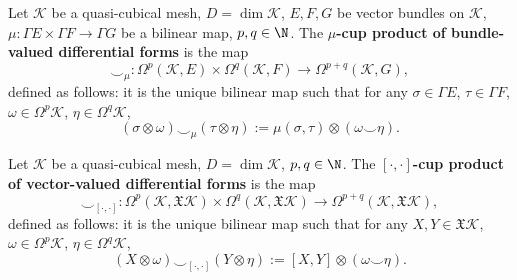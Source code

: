 \begin{definition}
  Let
    $\mathcal{K}$ be a quasi-cubical mesh,
    $D = \dim \mathcal{K}$,
    $E, F, G$ be vector bundles on $\mathcal{K}$,
    $\mu \colon \Gamma E \times \Gamma F \to \Gamma G$ be a bilinear map,
    $p, q \in \N$.
  The \textbf{$\mu$-cup product of bundle-valued differential forms} is the map
  \begin{equation}
    \smile_\mu
    \colon \Omega^p(\mathcal{K}, E) \times \Omega^q(\mathcal{K}, F)
    \to \Omega^{p + q}(\mathcal{K}, G),
  \end{equation}
  defined as follows: it is the unique bilinear map such that for any
  $\sigma \in \Gamma E$,
  $\tau \in \Gamma F$,
  $\omega \in \Omega^p \mathcal{K}$,
  $\eta \in \Omega^q \mathcal{K}$,
  \begin{equation}
    (\sigma \otimes \omega) \smile_\mu (\tau \otimes \eta) :=
    \mu(\sigma, \tau) \otimes (\omega \smile \eta).
  \end{equation}
\end{definition}
\begin{example}
  Let
    $\mathcal{K}$ be a quasi-cubical mesh,
    $D = \dim \mathcal{K}$,
    $p, q \in \N$.
  The \textbf{$[\cdot, \cdot]$-cup product of vector-valued differential forms}
  is the map
  \begin{equation}
    \smile_{[\cdot, \cdot]}
    \colon \Omega^p(\mathcal{K}, \mathfrak{X} \mathcal{K})
    \times \Omega^q(\mathcal{K}, \mathfrak{X} \mathcal{K})
    \to \Omega^{p + q}(\mathcal{K}, \mathfrak{X} \mathcal{K}),
  \end{equation}
  defined as follows: it is the unique bilinear map such that for any
  $X, Y \in \mathfrak{X} \mathcal{K}$,
  $\omega \in \Omega^p \mathcal{K}$,
  $\eta \in \Omega^q \mathcal{K}$,
  \begin{equation}
    (X \otimes \omega) \smile_{[\cdot, \cdot]} (Y \otimes \eta) :=
    [X, Y] \otimes (\omega \smile \eta).
  \end{equation}
\end{example}
